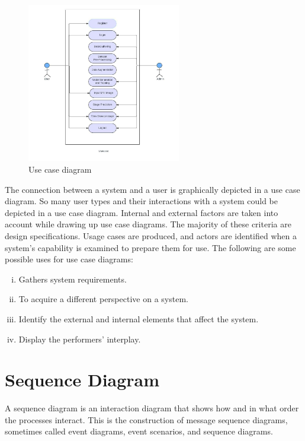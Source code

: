 \begin{figure}
    \centering
    \includegraphics[width=0.60\textwidth]{Img/Chap-01/10.jpg}
    \caption{Use case diagram \cite{mohapatra-54}}
    \label{fig:use_case_example}
\end{figure}

The connection between a system and a user is graphically depicted in a use case diagram. So many user types and their interactions with a system could be depicted in a use case diagram. Internal and external factors are taken into account while drawing up use case diagrams. The majority of these criteria are design specifications. Usage cases are produced, and actors are identified when a system's capability is examined to prepare them for use. The following are some possible uses for use case diagrams:

\begin{enumerate}[i)]
    \item Gathers system requirements.
    \item To acquire a different perspective on a system.
    \item Identify the external and internal elements that affect the system.
    \item Display the performers' interplay.
\end{enumerate}

\section{Sequence Diagram}

A sequence diagram is an interaction diagram that shows how and in what order the processes interact. This is the construction of message sequence diagrams, sometimes called event diagrams, event scenarios, and sequence diagrams.

